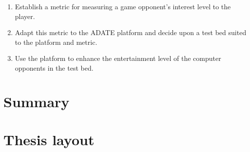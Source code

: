 \begin{enumerate}
\item Establish a metric for measuring a game opponent's interest level to the
  player.
\item Adapt this metric to the ADATE platform and decide upon a test bed suited
  to the platform and metric. 
\item Use the platform to enhance the entertainment level of the computer
  opponents in the test bed.
\end{enumerate}

\section{Summary}
\label{sec:summary}


\section{Thesis layout}
\label{sec:thesis-layout}





